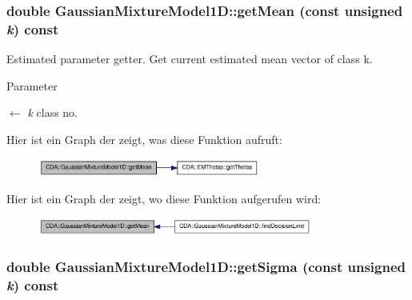 \hypertarget{classCDA_1_1GaussianMixtureModel1D_abd992452517cd8f0efc8f5408f898e33}{
\subsubsection[{getMean}]{\setlength{\rightskip}{0pt plus 5cm}double GaussianMixtureModel1D::getMean (const unsigned {\em k}) const}}
\label{classCDA_1_1GaussianMixtureModel1D_abd992452517cd8f0efc8f5408f898e33}


Estimated parameter getter. Get current estimated mean vector of class k. 


\begin{DoxyParams}{Parameter}
\item[\mbox{$\leftarrow$} {\em k}]class no. \end{DoxyParams}


Hier ist ein Graph der zeigt, was diese Funktion aufruft:\nopagebreak
\begin{figure}[H]
\begin{center}
\leavevmode
\includegraphics[width=207pt]{classCDA_1_1GaussianMixtureModel1D_abd992452517cd8f0efc8f5408f898e33_cgraph}
\end{center}
\end{figure}




Hier ist ein Graph der zeigt, wo diese Funktion aufgerufen wird:\nopagebreak
\begin{figure}[H]
\begin{center}
\leavevmode
\includegraphics[width=256pt]{classCDA_1_1GaussianMixtureModel1D_abd992452517cd8f0efc8f5408f898e33_icgraph}
\end{center}
\end{figure}


\hypertarget{classCDA_1_1GaussianMixtureModel1D_aa943f4410a27db1d9530b7c63e45b90b}{
\subsubsection[{getSigma}]{\setlength{\rightskip}{0pt plus 5cm}double GaussianMixtureModel1D::getSigma (const unsigned {\em k}) const}}
\label{classCDA_1_1GaussianMixtureModel1D_aa943f4410a27db1d9530b7c63e45b90b}


